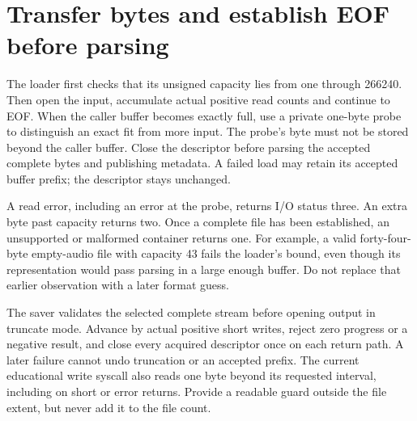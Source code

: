 \section{Transfer bytes and establish EOF before parsing}
The loader first checks that its unsigned capacity lies from one through 266240.
Then open the input, accumulate actual positive read counts and continue to EOF.
When the caller buffer becomes exactly full, use a private one-byte probe to distinguish
an exact fit from more input. The probe's byte must not be stored beyond the caller
buffer. Close the descriptor before parsing the accepted complete bytes and publishing
metadata. A failed load may retain its accepted buffer prefix; the descriptor stays
unchanged.

A read error, including an error at the probe, returns I/O status three. An extra byte
past capacity returns two. Once a complete file has been established, an unsupported
or malformed container returns one. For example, a valid forty-four-byte empty-audio
file with capacity 43 fails the loader's bound, even though its representation would
pass parsing in a large enough buffer. Do not replace that earlier observation with
a later format guess.

The saver validates the selected complete stream before opening output in truncate
mode. Advance by actual positive short writes, reject zero progress or a negative
result, and close every acquired descriptor once on each return path. A later failure
cannot undo truncation or an accepted prefix. The current educational write syscall
also reads one byte beyond its requested interval, including on short or error returns.
Provide a readable guard outside the file extent, but never add it to the file count.
